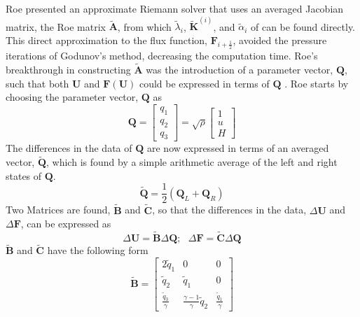 Roe \cite{ROE1997250} presented an approximate Riemann solver that uses an averaged Jacobian matrix, the Roe matrix $\tilde{\boldsymbol{A}}$, from which $\tilde{\lambda}_i$, $\tilde{\boldsymbol{K}}^{(i)}$, and $\tilde{\alpha}_i$ of  can be found directly. This direct approximation to the flux function, $\boldsymbol{F}_{i+\frac{1}{2}}$, avoided the pressure iterations of Godunov's method, decreasing the computation time. Roe's breakthrough in constructing $\tilde{\boldsymbol{A}}$ was the introduction of a parameter vector, $\boldsymbol{Q}$, such that both $\boldsymbol{U}$ and $\boldsymbol{F}\left(\boldsymbol{U}\right)$ could be expressed in terms of $\boldsymbol{Q}$ \cite{toro2013riemann}. Roe starts by choosing the parameter vector, $\boldsymbol{Q}$ as
\begin{equation}
	\boldsymbol{Q} = \begin{bmatrix}
		q_1\\ q_2\\ q_3
	\end{bmatrix} = \sqrt{\rho} \begin{bmatrix}
		1\\ u\\ H
	\end{bmatrix}
\end{equation}
The differences in the data of $\boldsymbol{Q}$ are now expressed in terms of an averaged vector, $\tilde{\boldsymbol{Q}}$, which is found by a simple arithmetic average of the left and right states of $\boldsymbol{Q}$.
\begin{equation}
	\tilde{\boldsymbol{Q}} = \frac{1}{2} \left(\boldsymbol{Q}_L + \boldsymbol{Q}_R\right)
\end{equation}
Two Matrices are found, $\tilde{\boldsymbol{B}}$ and $\tilde{\boldsymbol{C}}$, so that the differences in the data, $\Delta \boldsymbol{U}$ and $\Delta \boldsymbol{F}$, can be expressed as
\begin{equation}
	\Delta \boldsymbol{U} = \tilde{\boldsymbol{B}} \Delta \boldsymbol{Q} ; \,\,\,\, \Delta \boldsymbol{F} = \tilde{\boldsymbol{C}} \Delta \boldsymbol{Q}
\end{equation}
$\tilde{\boldsymbol{B}}$ and $\tilde{\boldsymbol{C}}$ have the following form
\begin{equation}
	\tilde{\boldsymbol{B}} = \begin{bmatrix}
		2\tilde{q}_1 & 0 & 0\\
		\tilde{q}_2 & \tilde{q}_1 & 0\\
		\frac{\tilde{q}_3}{\gamma} & \frac{\gamma-1}{\gamma}\tilde{q}_2 & \frac{\tilde{q}_1}{\gamma}
	\end{bmatrix}
\end{equation}
